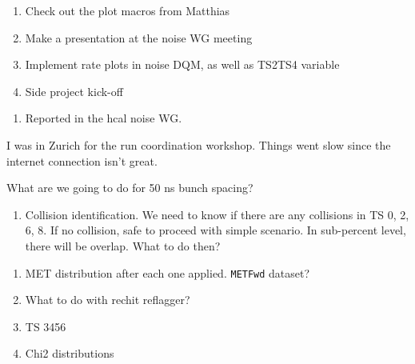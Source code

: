 

\begin{enumerate}
\item Check out the plot macros from Matthias
\item Make a presentation at the noise WG meeting
\item Implement rate plots in noise DQM, as well as TS2TS4 variable
\item Side project kick-off
\end{enumerate}


\begin{enumerate}
\item Reported in the hcal noise WG.
\end{enumerate}


I was in Zurich for the run coordination workshop.
Things went slow since the internet connection isn't great.


What are we going to do for 50 ns bunch spacing?

\begin{enumerate}
\item Collision identification.  We need to know if there are any collisions in TS 0, 2, 6, 8.
If no collision, safe to proceed with simple scenario.
In sub-percent level, there will be overlap.  What to do then?
\end{enumerate}



\begin{enumerate}
\item MET distribution after each one applied.  \texttt{METFwd} dataset?
\item What to do with rechit reflagger?
\item TS 3456
\item Chi2 distributions
\end{enumerate}





